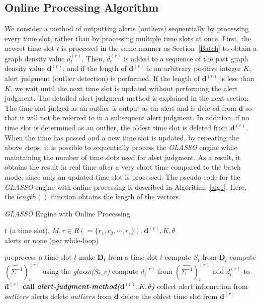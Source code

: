 \documentclass[conference]{IEEEtran}
\begin{document}
\subsection{Online Processing Algorithm}
We consider a method of outputting alerts (outliers) sequentially by processing every time slot, rather than by processing multiple time slots at once.
First, the newest time slot $t$ is processed in the same manner as Section~\ref{Batch} to obtain a graph density value $d_t^{(r)}$.
Then, $d_t^{(r)}$ is added to a sequence of the past graph density value $\bm{d}^{(r)}$, and if the length of $\bm{d}^{(r)}$ is an arbitrary positive integer $K$, alert judgment (outlier detection) is performed.
If the length of $\bm{d}^{(r)}$ is less than $K$, we wait until the next time slot is updated without performing the alert judgment.
The detailed alert judgment method is explained in the next section.
The time slot judged as an outlier is output as an alert and is deleted from $\bm{d}$ so that it will not be referred to in a subsequent alert judgment.
In addition, if no time slot is determined as an outlier, the oldest time slot is deleted from $\bm{d}^{(r)}$.
When the time has passed and a new time slot is updated, by repeating the above steps, it is possible to sequentially process the \textit{GLASSO} engine while maintaining the number of time slots used for alert judgment.
As a result, it obtains the result in real time after a very short time compared to the batch mode, since only an updated time slot is processed.
The pseudo code for the \textit{GLASSO} engine with online processing is described in Algorithm~\ref{alg1}.
Here, the $length()$ function obtains the length of the vectors.


\begin{algorithm}[tb]
\caption{\textit{GLASSO} Engine with Online Processing}
\label{alg1}
\begin{algorithmic}[1]
  \REQUIRE $t$ (a time slot), $M, r \in R ( = \{r_1, r_2, \cdots, r_s\} ), \bm{d}^{(r)}, K, \theta$\\
  \ENSURE alerts or none (per while-loop)

    \STATE preprocess a time slot $t$
    \STATE make $\bm{D}_t$ from a time slot $t$
    \STATE compute $S_t$ from $\bm{D}_t$
      \STATE compute ${(\hat{\Sigma^{-1}})}_t^{(r)}$ using the \textit{glasso($S_t,r$)}
      \STATE compute $d_t^{(r)}$ from ${(\hat{\Sigma^{-1}})}_t^{(r)}$
      \STATE add $d_t^{(r)}$ to $\bm{d}^{(r)}$
        \STATE \textbf{call} \textit{\textbf{alert-judgment-method($\bm{d}^{(r)}, K, \theta$)}}
          \STATE collect alert information from $outliers$
          \RETURN alerts
          \STATE delete $outliers$ from $\bm{d}$
        \ELSE
          \STATE delete the oldest time slot from $\bm{d}^{(r)}$
        \ENDIF
  		\ENDIF
  	\ENDFOR
  \ENDWHILE
\end{algorithmic}
\end{algorithm}
\end{document}
